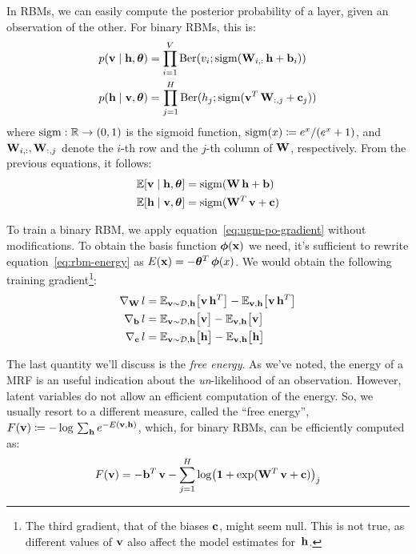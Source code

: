 In RBMs, we can easily compute the posterior probability of a layer, given an
observation of the other. For binary RBMs, this is:
\begin{equation}
	\begin{aligned}
		p(\mathbf{v} \mid \mathbf{h}, \bm{\theta}) &= \prod_{i=1}^V \operatorname{Ber}(v_i;
		\operatorname{sigm}(\mathbf{W}_{i,:}\, \mathbf{h} + \mathbf{b}_i)) \\
		p(\mathbf{h} \mid \mathbf{v}, \bm{\theta}) &= \prod_{j=1}^H \operatorname{Ber}(h_j;
		\operatorname{sigm}(\mathbf{v}^T\, \mathbf{W}_{:,j} + \mathbf{c}_j))
	\end{aligned}
	\label{eq:rbm-conditionals}
\end{equation}
where $\operatorname{sigm}: \mathbb{R} \to (0, 1)$ is the sigmoid function, $\operatorname{sigm}(x) \coloneqq
e^x/(e^x+1)$, and $\mathbf{W}_{i,:}, \mathbf{W}_{:,j}$ denote the $i$-th row
and the $j$-th column of $\mathbf{W}$, respectively. From the previous
equations, it follows:
\begin{equation}
	\begin{aligned}
		\mathbb{E}[\mathbf{v}\mid \mathbf{h},\bm{\theta}] &= \operatorname{sigm}(\mathbf{W}\, \mathbf{h} + \mathbf{b}) \\
		\mathbb{E}[\mathbf{h}\mid \mathbf{v},\bm{\theta}] &= \operatorname{sigm}(\mathbf{W}^T\, \mathbf{v} + \mathbf{c})
	\end{aligned}
	\label{eq:rbm-expectations}
\end{equation}

To train a binary RBM, we apply equation~\eqref{eq:ugm-po-gradient} without
modifications. To obtain the basis function $\bm{\phi}(\mathbf{x})$ we need, it's
sufficient to rewrite equation~\eqref{eq:rbm-energy} as $E(\mathbf{x}) = -\bm{\theta}^T\,
\bm{\phi}(x)$. We would obtain the following training gradient\footnote{The
third gradient, that of the biases $\mathbf{c}$, might seem null. This is not
true, as different values of $\mathbf{v}$ also affect the model estimates
for~$\mathbf{h}$.}:
\begin{equation}
	\begin{aligned}
		\nabla_{\mathbf{W}}\,l &=
			\mathbb{E}_{\mathbf{v} \sim \mathcal{D},\mathbf{h}} \bigl[ \mathbf{v}\, \mathbf{h}^T \bigr] -
			\mathbb{E}_{\mathbf{v},\mathbf{h}} \bigl[ \mathbf{v}\, \mathbf{h}^T \bigr] \\
		\nabla_{\mathbf{b}}\,l &=
			\mathbb{E}_{\mathbf{v} \sim \mathcal{D},\mathbf{h}} \bigl[ \mathbf{v} \bigr] -
			\mathbb{E}_{\mathbf{v},\mathbf{h}} \bigl[ \mathbf{v} \bigr] \\
		\nabla_{\mathbf{c}}\,l &=
			\mathbb{E}_{\mathbf{v} \sim \mathcal{D},\mathbf{h}} \bigl[ \mathbf{h} \bigr] -
			\mathbb{E}_{\mathbf{v},\mathbf{h}} \bigl[ \mathbf{h} \bigr]
	\end{aligned}
	\label{eq:rbm-gradients}
\end{equation}

The last quantity we'll discuss is the \emph{free energy}. As we've noted, the
energy of a MRF is an useful indication about the \emph{un}-likelihood of an
observation. However, latent variables do not allow an efficient computation
of the energy. So, we usually resort to a different measure, called the ``free
energy'', $F(\mathbf{v}) \coloneqq - \log\, \sum_{\mathbf{h}} e^{-E(\mathbf{v}, \mathbf{h})}$, which, for
binary RBMs, can be efficiently computed as:
\begin{equation}
	F(\mathbf{v}) = - \mathbf{b}^T\, \mathbf{v} - \sum_{j=1}^H \log
		\bigl(\mathbf{1} + \exp(\mathbf{W}^T\, \mathbf{v} + \mathbf{c}) \bigr)_j
\end{equation}



